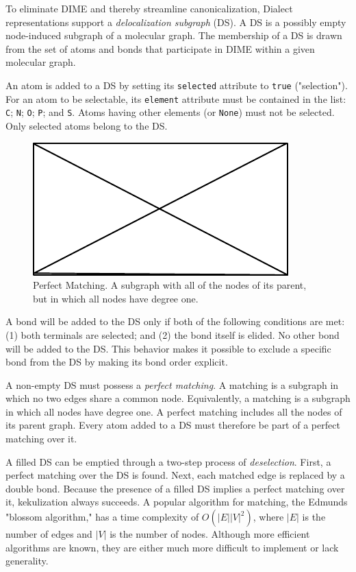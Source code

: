 \documentclass{article}
\def\ttt{\texttt}
\begin{document}
To eliminate DIME and thereby streamline canonicalization, Dialect representations support a \textit{delocalization subgraph} (DS). A DS is a possibly empty node-induced subgraph of a molecular graph. The membership of a DS is drawn from the set of atoms and bonds that participate in DIME within a given molecular graph.

An atom is added to a DS by setting its \ttt{selected} attribute to \ttt{true} ("selection"). For an atom to be selectable, its \ttt{element} attribute must be contained in the list: \ttt{C}; \ttt{N}; \ttt{O}; \ttt{P}; and \ttt{S}. Atoms having other elements (or \ttt{None}) must not be selected. Only selected atoms belong to the DS.

\begin{figure}
    \centering
    \includegraphics{filler}
    \caption{Perfect Matching. A subgraph with all of the nodes of its parent, but in which all nodes have degree one.}
    \label{fig:perfect-matching}
\end{figure}

A bond will be added to the DS only if both of the following conditions are met: (1) both terminals are selected; and (2) the bond itself is elided. No other bond will be added to the DS. This behavior makes it possible to exclude a specific bond from the DS by making its bond order explicit.

A non-empty DS must possess a \textit{perfect matching}. A matching is a subgraph in which no two edges share a common node. Equivalently, a matching is a subgraph in which all nodes have degree one. A perfect matching includes all the nodes of its parent graph. Every atom added to a DS must therefore be part of a perfect matching over it.

A filled DS can be emptied through a two-step process of \textit{deselection}. First, a perfect matching over the DS is found. Next, each matched edge is replaced by a double bond. Because the presence of a filled DS implies a perfect matching over it, kekulization always succeeds. A popular algorithm for matching, the Edmunds "blossom algorithm,"\cite{edmonds:1965} has a time complexity of $O(|E||V|^2)$, where $|E|$ is the number of edges and $|V|$ is the number of nodes. Although more efficient algorithms are known, they are either much more difficult to implement or lack generality.
\end{document}
